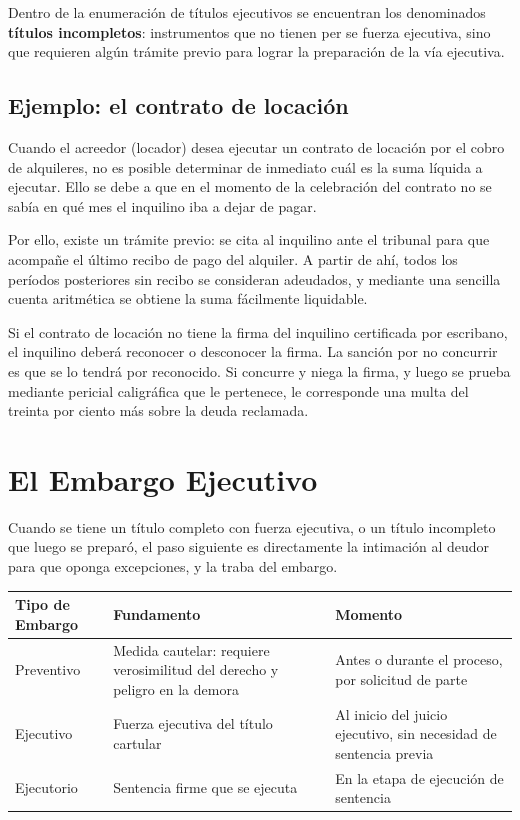 \documentclass[12pt,oneside]{book}
\begin{document}
Dentro de la enumeración de títulos ejecutivos se encuentran los denominados \textbf{títulos incompletos}: instrumentos que no tienen per se fuerza ejecutiva, sino que requieren algún trámite previo para lograr la preparación de la vía ejecutiva.

\subsection{Ejemplo: el contrato de locación}

Cuando el acreedor (locador) desea ejecutar un contrato de locación por el cobro de alquileres, no es posible determinar de inmediato cuál es la suma líquida a ejecutar. Ello se debe a que en el momento de la celebración del contrato no se sabía en qué mes el inquilino iba a dejar de pagar.

Por ello, existe un trámite previo: se cita al inquilino ante el tribunal para que acompañe el último recibo de pago del alquiler. A partir de ahí, todos los períodos posteriores sin recibo se consideran adeudados, y mediante una sencilla cuenta aritmética se obtiene la suma fácilmente liquidable.

Si el contrato de locación no tiene la firma del inquilino certificada por escribano, el inquilino deberá reconocer o desconocer la firma. La sanción por no concurrir es que se lo tendrá por reconocido. Si concurre y niega la firma, y luego se prueba mediante pericial caligráfica que le pertenece, le corresponde una multa del treinta por ciento más sobre la deuda reclamada.

\section{El Embargo Ejecutivo}

Cuando se tiene un título completo con fuerza ejecutiva, o un título incompleto que luego se preparó, el paso siguiente es directamente la intimación al deudor para que oponga excepciones, y la traba del embargo.

\begin{table}[H]
\centering
\begin{tabularx}{\textwidth}{>{\raggedright\arraybackslash}p{2.5cm}>{\raggedright\arraybackslash}p{3.5cm}>{\raggedright\arraybackslash}X}
\toprule
\textbf{Tipo de Embargo} & \textbf{Fundamento} & \textbf{Momento} \\
\midrule
Preventivo & Medida cautelar: requiere verosimilitud del derecho y peligro en la demora & Antes o durante el proceso, por solicitud de parte \\
\midrule
Ejecutivo & Fuerza ejecutiva del título cartular & Al inicio del juicio ejecutivo, sin necesidad de sentencia previa \\
\midrule
Ejecutorio & Sentencia firme que se ejecuta & En la etapa de ejecución de sentencia \\
\bottomrule
\end{tabularx}
\end{table}
\end{document}
